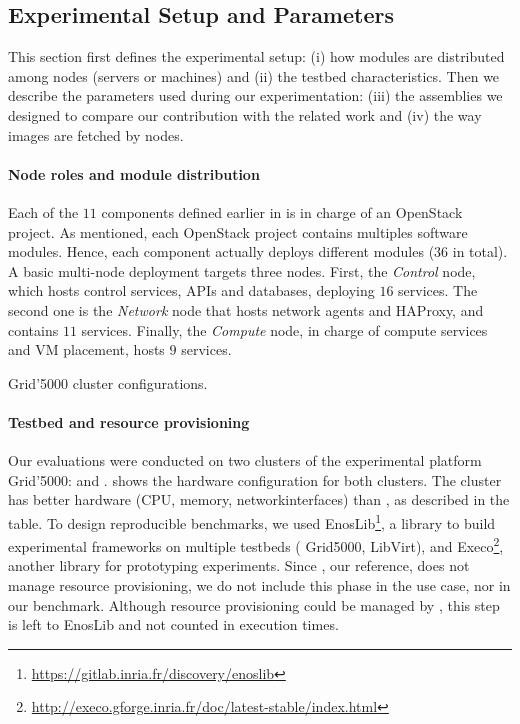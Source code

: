 \subsection{Experimental Setup and Parameters}

This section first defines the experimental setup: (i) how modules are
distributed among nodes (\ie servers or machines) and (ii) the testbed
characteristics. Then we describe the parameters used during
our experimentation: (iii) the assemblies we designed to compare our
contribution with the related work and (iv) the way \docker images are
fetched by nodes.

\paragraph{Node roles and module distribution}
Each of the $11$ components defined earlier in \kolla is in charge of
an OpenStack project. As mentioned, each OpenStack project
contains multiples software modules. Hence, each component actually
deploys different modules ($36$ in total). A basic multi-node \kolla
deployment targets three nodes. First, the \emph{Control} node, which
hosts control services, APIs and databases, deploying $16$
services. The second one is the \emph{Network} node that hosts network
agents and HAProxy, and contains $11$ services. Finally, the
\emph{Compute} node, in charge of compute services and VM placement,
hosts $9$ services.

\begin{table}
  \begin{center}
    \small
    
    \caption{Grid'5000 cluster configurations.}
    \label{tab:g5k}
  \end{center}
\end{table}

\paragraph{Testbed and resource provisioning}
Our evaluations were conducted on two clusters of the
experimental platform Grid'5000: \ecotype and \nova. 
shows the hardware configuration for both clusters. The cluster
\ecotype has better hardware (CPU, memory, networkinterfaces) than \nova,
as described in the table. To design reproducible benchmarks, we used
EnosLib\footnote{\url{https://gitlab.inria.fr/discovery/enoslib}}, a
library to build experimental frameworks on multiple testbeds (\eg
Grid5000, LibVirt), and
Execo\footnote{\url{http://execo.gforge.inria.fr/doc/latest-stable/index.html}},
another library for prototyping experiments. Since \kolla, our
reference, does not manage resource provisioning, we do not include
this phase in the use case, nor in our benchmark. Although resource
provisioning could be managed by \mad, this step is left to EnosLib
and not counted in execution times.

